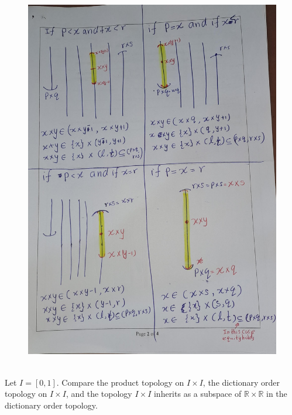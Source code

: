 \documentclass[
]{book}
\theoremstyle{definition}
\theoremstyle{definition}
\theoremstyle{definition}
\theoremstyle{definition}
\theoremstyle{remark}
\begin{document}
\begin{figure}
\centering
\includegraphics{figures/figure 12.jpg}
\caption{\label{fig:figm12}\(~\)}
\end{figure}

Let \(I = [0, 1]\). Compare the product topology on \(I \times I\), the dictionary order topology on \(I \times I\), and the topology \(I \times I\) inherits as a subspace of \(\mathbb{R} \times \mathbb{R}\) in the dictionary order topology.
\end{document}
